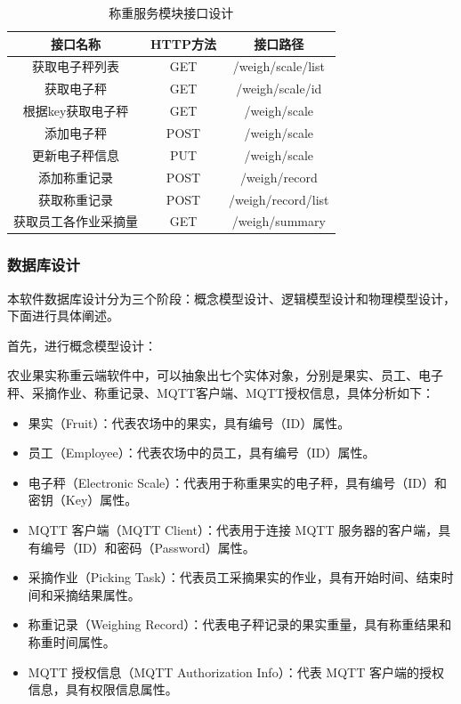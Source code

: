 \documentclass{xduugmr}
\begin{document}
\begin{table}[H]
\centering
\begin{tabular}{|c|c|c|}
\hline
\textbf{接口名称} & \textbf{HTTP方法} & \textbf{接口路径} \\
\hline
获取电子秤列表 & GET & /weigh/scale/list \\
\hline
获取电子秤 & GET & /weigh/scale/{id} \\
\hline
根据key获取电子秤 & GET & /weigh/scale \\
\hline
添加电子秤 & POST & /weigh/scale \\
\hline
更新电子秤信息 & PUT & /weigh/scale \\
\hline
添加称重记录 & POST & /weigh/record \\
\hline
获取称重记录 & POST & /weigh/record/list \\
\hline
获取员工各作业采摘量 & GET & /weigh/summary \\
\hline
\end{tabular}%

\caption{称重服务模块接口设计}
\label{tab:称重服务模块接口设计}
\end{table}


\subsubsection{数据库设计}

本软件数据库设计分为三个阶段：概念模型设计、逻辑模型设计和物理模型设计，下面进行具体阐述。

首先，进行概念模型设计：

农业果实称重云端软件中，可以抽象出七个实体对象，分别是果实、员工、电子秤、采摘作业、称重记录、MQTT客户端、MQTT授权信息，具体分析如下：

\begin{itemize}
    \item 果实（Fruit）：代表农场中的果实，具有编号（ID）属性。
    \item 员工（Employee）：代表农场中的员工，具有编号（ID）属性。
    \item 电子秤（Electronic Scale）：代表用于称重果实的电子秤，具有编号（ID）和密钥（Key）属性。
    \item MQTT 客户端（MQTT Client）：代表用于连接 MQTT 服务器的客户端，具有编号（ID）和密码（Password）属性。
    \item 采摘作业（Picking Task）：代表员工采摘果实的作业，具有开始时间、结束时间和采摘结果属性。
    \item 称重记录（Weighing Record）：代表电子秤记录的果实重量，具有称重结果和称重时间属性。
    \item MQTT 授权信息（MQTT Authorization Info）：代表 MQTT 客户端的授权信息，具有权限信息属性。
\end{itemize}
\end{document}
